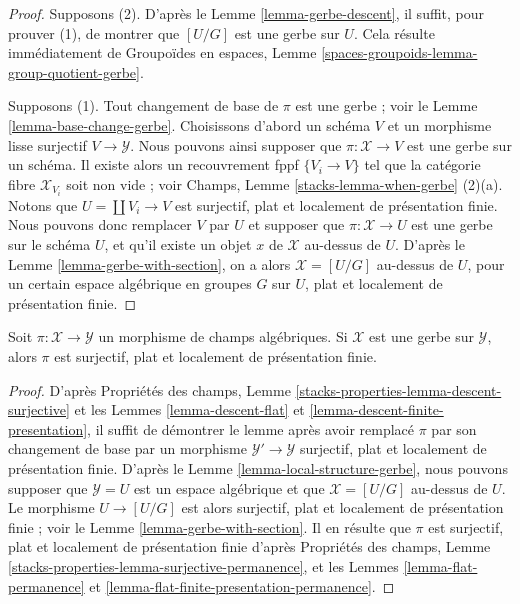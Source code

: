 \begin{proof}
Supposons (2). D'après le Lemme \ref{lemma-gerbe-descent}, il suffit, pour
prouver (1), de montrer que $[U/G]$ est une gerbe sur $U$. Cela
résulte immédiatement de Groupoïdes en espaces, Lemme
\ref{spaces-groupoids-lemma-group-quotient-gerbe}.

\medskip\noindent
Supposons (1). Tout changement de base de $\pi$ est une gerbe ; voir le
Lemme \ref{lemma-base-change-gerbe}. Choisissons d'abord un schéma $V$ et un
morphisme lisse surjectif $V \to \mathcal{Y}$. Nous pouvons ainsi supposer que
$\pi : \mathcal{X} \to V$ est une gerbe sur un schéma. Il existe alors
un recouvrement fppf $\{V_i \to V\}$ tel que la catégorie fibre
$\mathcal{X}_{V_i}$ soit non vide ; voir Champs, Lemme
\ref{stacks-lemma-when-gerbe} (2)(a). Notons que
$U = \coprod V_i \to V$ est surjectif, plat et localement de présentation
finie. Nous pouvons donc remplacer $V$ par $U$ et supposer que
$\pi : \mathcal{X} \to U$ est une gerbe sur le schéma $U$, et qu'il
existe un objet $x$ de $\mathcal{X}$ au-dessus de $U$. D'après le
Lemme \ref{lemma-gerbe-with-section}, on a alors
$\mathcal{X} = [U/G]$ au-dessus de $U$, pour un certain espace algébrique en
groupes $G$ sur $U$, plat et localement de présentation finie.
\end{proof}

\begin{lemma}
\label{lemma-gerbe-fppf}
Soit $\pi : \mathcal{X} \to \mathcal{Y}$ un morphisme de champs algébriques.
Si $\mathcal{X}$ est une gerbe sur $\mathcal{Y}$, alors $\pi$ est
surjectif, plat et localement de présentation finie.
\end{lemma}

\begin{proof}
D'après Propriétés des champs, Lemme
\ref{stacks-properties-lemma-descent-surjective}
et les Lemmes \ref{lemma-descent-flat} et
\ref{lemma-descent-finite-presentation}, il suffit de démontrer le lemme après
avoir remplacé $\pi$ par son changement de base par un morphisme
$\mathcal{Y}' \to \mathcal{Y}$ surjectif, plat et localement de présentation
finie. D'après le Lemme \ref{lemma-local-structure-gerbe}, nous pouvons
supposer que $\mathcal{Y} = U$ est un espace algébrique et que
$\mathcal{X} = [U/G]$ au-dessus de $U$. Le morphisme $U \to [U/G]$ est alors
surjectif, plat et localement de présentation finie ; voir le
Lemme \ref{lemma-gerbe-with-section}. Il en résulte que $\pi$ est surjectif,
plat et localement de présentation finie d'après Propriétés des champs, Lemme
\ref{stacks-properties-lemma-surjective-permanence}, et les
Lemmes \ref{lemma-flat-permanence} et
\ref{lemma-flat-finite-presentation-permanence}.
\end{proof}

